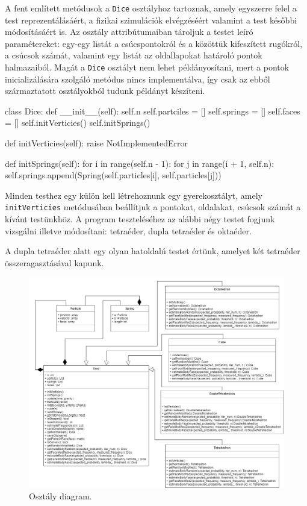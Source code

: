 A fent említett metódusok a \texttt{Dice} osztályhoz tartoznak, amely egyszerre felel a test reprezentálásáért, a fizikai szimulációk elvégzéséért valamint a test későbbi módosításáért is.
Az osztály attribútumaiban tároljuk a testet leíró paramétereket: egy-egy listát a csúcspontokról és a közöttük kifeszített rugókról, a csúcsok számát, valamint egy listát az oldallapokat határoló pontok halmazaiból.
Magát a \texttt{Dice} osztályt nem lehet példányosítani, mert a pontok inicializálására szolgáló metódus nincs implementálva, így csak az ebből származtatott osztályokból tudunk példányt készíteni.
\begin{python}
class Dice:
    def __init__(self):
        self.n
        self.partciles = []
        self.springs = []
        self.faces = []
        self.initVerticies()
        self.initSprings()

    def initVerticies(self):
        raise NotImplementedError

    def initSprings(self):
        for i in range(self.n - 1):
            for j in range(i + 1, self.n):
                	self.springs.append(Spring(self.particles[i],
                	                           self.particles[j]))
\end{python}
Minden testhez egy külön kell létrehoznunk egy gyerekosztályt, amely \texttt{initVerticies} metódusában beállítjuk a pontokat, oldalakat, csúcsok számát a kívánt testünkhöz.
A program teszteléséhez az alábbi négy testet fogjunk vizsgálni illetve módosítani: tetraéder, dupla tetraéder és oktaéder.
\begin{remark}
A dupla tetraéder alatt egy olyan hatoldalú testet értünk, amelyet két tetraéder összeragasztásával kapunk.
\end{remark}

\begin{figure}[h!]
	\centering
	\includegraphics[width=\textwidth]{images/uml.png}
	\caption{Osztály diagram.}
	\label{fig:uml}
\end{figure}


